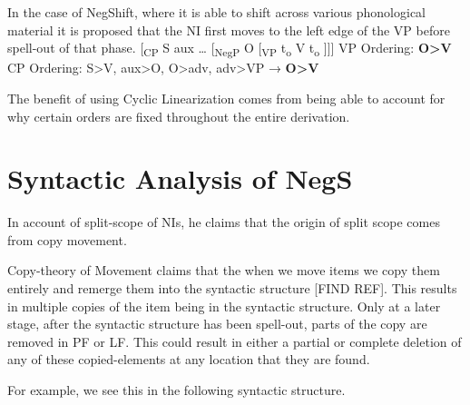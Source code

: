 \documentclass[12pt, letterpaper]{article}
\begin{document}
\ex In the case of NegShift, where it is able to shift across various phonological material it is proposed that the NI first moves to the left edge of the VP before spell-out of that phase. 
\vspace{6pt}
	\ea {}[\textsubscript{CP} S aux … [\textsubscript{NegP} O [\textsubscript{VP} t\textsubscript{o}  V t\textsubscript{o} ]]]
	\ex VP Ordering: \textbf{O>V}\\
	CP Ordering: S>V, aux>O, O>adv, adv>VP → \textbf{O>V}
	\z

\ex The benefit of using Cyclic Linearization comes from being able to account for why certain orders are fixed throughout the entire derivation.
\z 


\section{Syntactic Analysis of NegS} \label{sec:NEXT}
\ea In  account of split-scope of NIs, he claims that the origin of split scope comes from copy movement. 

\ex Copy-theory of Movement claims that the when we move items we copy them entirely and remerge them into the syntactic structure [FIND REF]. This results in multiple copies of the item being in the syntactic structure. Only at a later stage, after the syntactic structure has been spell-out, parts of the copy are removed in PF or LF. This could result in either a partial or complete deletion of any of these copied-elements at any location that they are found. 

\ex For example, we see this in the following syntactic structure. 
	\ea {}
	\z
\end{document}
